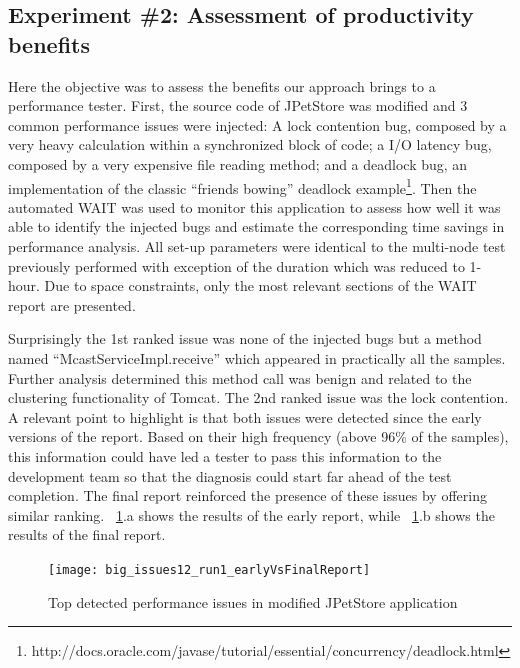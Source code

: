 \documentclass[runningheads,a4paper]{llncs}
\begin{document}
\vspace{-5pt}
\subsection{Experiment \#2: Assessment of productivity benefits}
\vspace{-2pt}

Here the objective was to assess the benefits our approach brings to a
performance tester. First, the source code of JPetStore was modified and 3
common performance issues were injected: A lock contention bug, composed by a
very heavy calculation within a synchronized block of code; a I/O latency bug, 
composed by a very expensive file reading method; and a deadlock bug, an
implementation of the classic ``friends bowing'' deadlock example\footnote{http://docs.oracle.com/javase/tutorial/essential/concurrency/deadlock.html}.
Then the automated WAIT was used to monitor this application to assess how well
it was able to identify the injected bugs and estimate the corresponding time
savings in performance analysis. All set-up parameters were identical to
the multi-node test previously performed with exception of the duration which
was reduced to 1-hour. Due to space constraints, only the most relevant sections
of the WAIT report are presented.

Surprisingly the 1st ranked issue was none of the injected bugs but a method
named ``McastServiceImpl.receive'' which appeared in practically all the
samples. Further analysis determined this method call was benign and related
to the clustering functionality of Tomcat. The 2nd ranked issue was the lock
contention. A relevant point to highlight is that both issues were detected
since the early versions of the report. Based on their high frequency (above
96\% of the samples), this information could have led a tester to pass this
information to the development team so that the diagnosis could start far ahead
of the test completion. The final report reinforced the presence of these issues 
by offering similar ranking. \figurename ~\ref{fig_run1_bugs12}.a shows the
results of the early report, while ~\ref{fig_run1_bugs12}.b shows the results of the final report.

\begin{figure}[!h]
\centering
\texttt{[image: big\_issues12\_run1\_earlyVsFinalReport]}
\caption{Top detected performance issues in modified JPetStore application}
\label{fig_run1_bugs12}
\end{figure}
\end{document}
